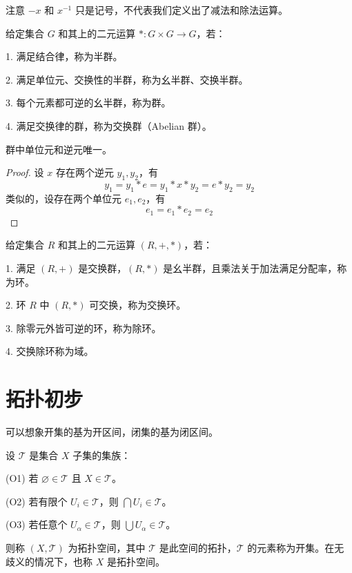 注意 $-x$ 和 $x^{-1}$ 只是记号，不代表我们定义出了减法和除法运算。

\begin{definition}[群，半群]
	给定集合 $G$ 和其上的二元运算 $\ast: G \times G \to G$，若：

	1. 满足结合律，称为半群。

	2. 满足单位元、交换性的半群，称为幺半群、交换半群。

	3. 每个元素都可逆的幺半群，称为群。

	4. 满足交换律的群，称为交换群（Abelian 群）。
\end{definition}

\begin{example}
	群中单位元和逆元唯一。
\end{example}

\begin{proof}
	设 $x$ 存在两个逆元 $y_1, y_2$，有
	\[ y_1 = y_1 \ast e = y_1 \ast x \ast y_2 = e \ast y_2 = y_2 \]
	类似的，设存在两个单位元 $e_1, e_2$，有
	\[ e_1 = e_1 \ast e_2 = e_2 \]
\end{proof}

\begin{definition}[环，域]
	给定集合 $R$ 和其上的二元运算 $(R, +, \ast)$，若：

	1. 满足 $(R, +)$ 是交换群，$(R, \ast)$ 是幺半群，且乘法关于加法满足分配率，称为环。

	2. 环 $R$ 中 $(R, \ast)$ 可交换，称为交换环。

	3. 除零元外皆可逆的环，称为除环。

	4. 交换除环称为域。
\end{definition}

\section{拓扑初步}

可以想象开集的基为开区间，闭集的基为闭区间。

\begin{definition}[拓扑空间]
	设 $\mathcal{T}$ 是集合 $X$ 子集的集族：

	(O1) 若 $\varnothing \in \mathcal{T}$ 且 $X \in \mathcal{T}$。

	(O2) 若有限个 $U_i \in \mathcal{T}$，则 $\bigcap U_i \in \mathcal{T}$。

	(O3) 若任意个 $U_\alpha \in \mathcal{T}$，则 $\bigcup {U_\alpha} \in \mathcal{T}$。

	则称 $(X, \mathcal{T})$ 为拓扑空间，其中 $\mathcal{T}$ 是此空间的拓扑，$\mathcal{T}$ 的元素称为开集。在无歧义的情况下，也称 $X$ 是拓扑空间。
\end{definition}

